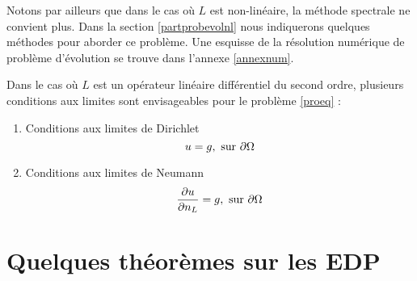 \documentclass[12pt]{book}
\begin{document}
\begin{rem}
Notons par ailleurs que dans le cas o\`u $L$ est non-lin\'eaire, la
m\'ethode spectrale ne convient plus. Dans la section
\ref{partprobevolnl} nous indiquerons quelques m\'ethodes pour aborder
ce probl\`eme. 
Une esquisse de la r\'esolution num\'erique de probl\`eme d'\'evolution
se trouve dans l'annexe \ref{annexnum}.
\end{rem}

Dans le cas o\`u $L$ est un op\'erateur lin\'eaire diff\'erentiel du
second ordre, plusieurs conditions aux limites sont envisageables pour
le probl\`eme \ref{proeq} :
\begin{enumerate}
\item Conditions aux limites de Dirichlet
\begin{equation}
u=g,\ {\rm sur}\ \partial\Omega
\end{equation}
\item Conditions aux limites de Neumann
\begin{equation}
\frac{\partial u}{\partial n_L}=g,\ {\rm sur}\ \partial\Omega
\end{equation}
\end{enumerate}

\section{Quelques th\'eor\`emes sur les EDP}
\end{document}
